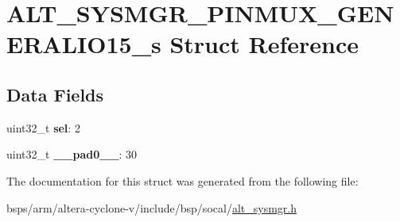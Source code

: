 \hypertarget{structALT__SYSMGR__PINMUX__GENERALIO15__s}{}\section{A\+L\+T\+\_\+\+S\+Y\+S\+M\+G\+R\+\_\+\+P\+I\+N\+M\+U\+X\+\_\+\+G\+E\+N\+E\+R\+A\+L\+I\+O15\+\_\+s Struct Reference}
\label{structALT__SYSMGR__PINMUX__GENERALIO15__s}
\subsection*{Data Fields}
\begin{DoxyCompactItemize}
\item 
\mbox{\label{structALT__SYSMGR__PINMUX__GENERALIO15__s_a9a9621c6eb07cbd3dbbfdd32ea5844be}} 
uint32\+\_\+t {\bfseries sel}\+: 2
\item 
\mbox{\label{structALT__SYSMGR__PINMUX__GENERALIO15__s_a73a810620fd05878dfcea429ea2ae7b1}} 
uint32\+\_\+t {\bfseries \+\_\+\+\_\+pad0\+\_\+\+\_\+}\+: 30
\end{DoxyCompactItemize}


The documentation for this struct was generated from the following file\+:\begin{DoxyCompactItemize}
\item 
bsps/arm/altera-\/cyclone-\/v/include/bsp/socal/\mbox{\hyperlink{alt__sysmgr_8h}{alt\+\_\+sysmgr.\+h}}\end{DoxyCompactItemize}
